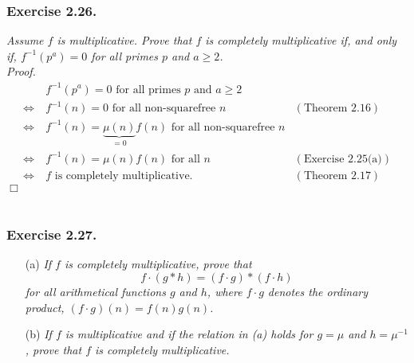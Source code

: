 \documentclass{article}
\begin{document}



\subsubsection*{Exercise 2.26.}
\emph{Assume $f$ is multiplicative.
Prove that $f$ is completely multiplicative if, and only if,
$f^{-1}(p^a) = 0$ for all primes $p$ and $a \geq 2$.} \\



\emph{Proof.}
  \begin{align*}
    & \:
    \text{$f^{-1}(p^a) = 0$ for all primes $p$ and $a \geq 2$} \\
    \Longleftrightarrow & \:
    \text{$f^{-1}(n) = 0$ for all non-squarefree $n$}
        &(\text{Theorem 2.16}) \\
    \Longleftrightarrow & \:
    \text{$f^{-1}(n) = \underbrace{\mu(n)}_{= 0}f(n)$ for all non-squarefree $n$} \\
    \Longleftrightarrow & \:
    \text{$f^{-1}(n) = \mu(n)f(n)$ for all $n$}
        &(\text{Exercise 2.25(a)}) \\
    \Longleftrightarrow & \:
    \text{$f$ is completely multiplicative}.
        &(\text{Theorem 2.17})
  \end{align*}
$\Box$ \\\\






\subsubsection*{Exercise 2.27.}
\begin{enumerate}
\item[(a)]
  \emph{If $f$ is completely multiplicative,
  prove that
  \[
    f \cdot (g * h) = (f \cdot g) * (f \cdot h)
  \]
  for all arithmetical functions $g$ and $h$,
  where $f \cdot g$ denotes the ordinary product,
  $(f \cdot g)(n) = f(n)g(n)$.}

\item[(b)]
  \emph{If $f$ is multiplicative and if the relation in (a) holds for $g = \mu$ and $h = \mu^{-1}$,
  prove that $f$ is completely multiplicative.} \\
\end{enumerate}
\end{document}
